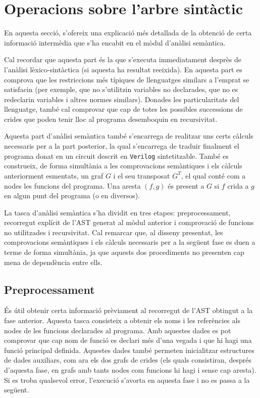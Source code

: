 \section{Operacions sobre l'arbre sintàctic} \label{sec:graf}

En aquesta secció, s'ofereix una explicació més detallada de la obtenció de 
certa informació intermèdia que s'ha encabit en el mòdul d'anàlisi semàntica.

Cal recordar que aquesta part és la que s'executa immediatament desprès de 
l'anàlisi lèxico-sintàctica (si aquesta ha resultat reeixida). En aquesta part 
es comprova que les restriccions més típiques de llenguatges similars a 
l'emprat se satisfacin (per exemple, que no s'utilitzin variables no 
declarades, que no es redeclarin variables i altres normes similars). Donades 
les particularitats del llenguatge, també cal comprovar que cap de totes les 
possibles successions de crides que poden tenir lloc al programa desemboquin 
en recursivitat.

Aquesta part d'anàlisi semàntica també s'encarrega de realitzar uns certs 
càlculs necessaris per a la part posterior, la qual s'encarrega de traduir 
finalment el programa donat en un circuit descrit en \texttt{Verilog} 
sintetitzable. També es construeix, de forma simultània a les comprovacions 
semàntiques i els càlculs anteriorment esmentats, un graf $G$ i el seu 
transposat $G^{T}$, el qual conté com a nodes les funcions del programa. Una 
aresta $(f,g)$ és present a $G$ si $f$ crida a $g$ en algun punt del programa 
(o en diversos).

La tasca d'anàlisi semàntica s'ha dividit en tres etapes: preprocessament, 
recorregut explícit de l'AST generat al mòdul anterior i comprovació de 
funcions no utilitzades i recursivitat. Cal remarcar que, al disseny presentat,
les comprovacions semàntiques i els càlculs necessaris per a la següent fase 
es duen a terme de forma simultània, ja que aquests dos procediments no 
presenten cap mena de dependència entre ells.


\subsection{Preprocessament}

És útil obtenir certa informació prèviament al recorregut de l'AST obtingut a 
la fase anterior. Aquesta tasca consisteix a obtenir els noms i les referències
als nodes de les funcions declarades al programa. Amb aquestes dades es pot 
comprovar que cap nom de funció es declari més d'una vegada i que hi hagi una 
funció principal definida. Aquestes dades també permeten inicialitzar 
estructures de dades auxiliars, com ara els dos grafs de crides (els 
quals consistiran, després d'aquesta fase, en grafs amb tants nodes com 
funcions hi hagi i sense cap aresta). Si es troba qualsevol error, l'execució 
s'avorta en aquesta fase i no es passa a la següent.


